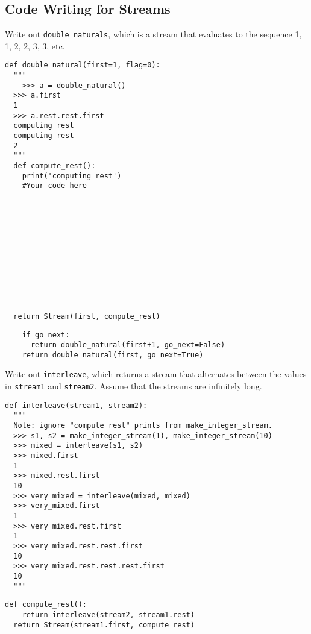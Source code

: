 \documentclass{exam}
\begin{document}
\subsection{Code Writing for Streams}

\begin{questions}
\question Write out \texttt{double\_naturals}, which is a stream that evaluates to the sequence 1, 1, 2, 2, 3, 3, etc.
\begin{lstlisting}
def double_natural(first=1, flag=0):
  """
    >>> a = double_natural()
  >>> a.first
  1
  >>> a.rest.rest.first
  computing rest
  computing rest
  2
  """
  def compute_rest():
    print('computing rest')
    #Your code here












  return Stream(first, compute_rest)
\end{lstlisting}

\begin{solution}
\begin{lstlisting}
    if go_next:
      return double_natural(first+1, go_next=False)
    return double_natural(first, go_next=True)
\end{lstlisting}
\end{solution}

\clearpage

\question Write out \texttt{interleave}, which returns a stream that alternates between the values in \texttt{stream1} and \texttt{stream2}. Assume that the streams are infinitely long.
\begin{lstlisting}
def interleave(stream1, stream2):
  """
  Note: ignore "compute rest" prints from make_integer_stream.
  >>> s1, s2 = make_integer_stream(1), make_integer_stream(10)
  >>> mixed = interleave(s1, s2)
  >>> mixed.first
  1
  >>> mixed.rest.first
  10
  >>> very_mixed = interleave(mixed, mixed)
  >>> very_mixed.first
  1
  >>> very_mixed.rest.first
  1
  >>> very_mixed.rest.rest.first
  10
  >>> very_mixed.rest.rest.rest.first
  10
  """

\end{lstlisting}

\begin{solution}
\begin{lstlisting}
def compute_rest():
    return interleave(stream2, stream1.rest)
  return Stream(stream1.first, compute_rest)
\end{lstlisting}
\end{solution}
\end{questions}


\end{document}
